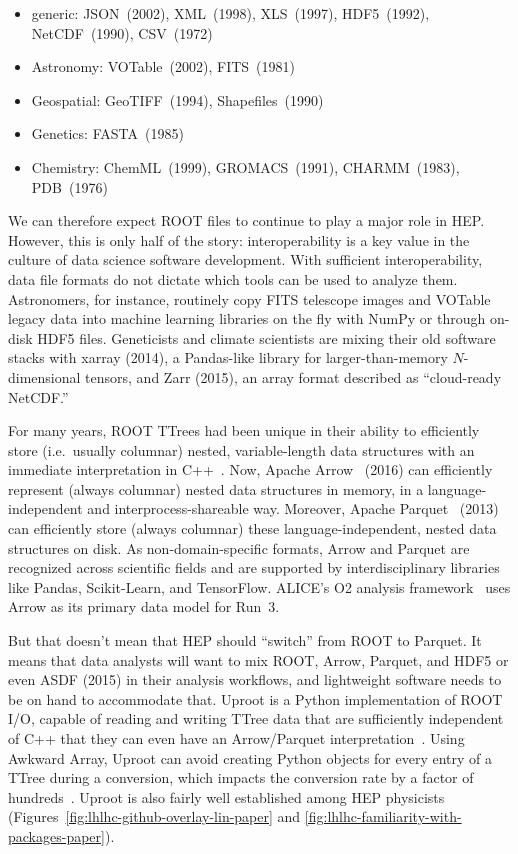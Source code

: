 \documentclass[12pt,a4paper]{article}
\begin{document}
\begin{itemize}\setlength{\itemsep}{-0.15 cm}
\item generic: JSON~(2002), XML~(1998), XLS~(1997), HDF5~(1992), NetCDF~(1990), CSV~(1972)
\item Astronomy: VOTable~(2002), FITS~(1981)
\item Geospatial: GeoTIFF~(1994), Shapefiles~(1990)
\item Genetics: FASTA~(1985)
\item Chemistry: ChemML~(1999), GROMACS~(1991), CHARMM~(1983), PDB~(1976)
\end{itemize}
%
We can therefore expect ROOT files to continue to play a major role in HEP. However, this is only half of the story: interoperability is a key value in the culture of data science software development. With sufficient interoperability, data file formats do not dictate which tools can be used to analyze them. Astronomers, for instance, routinely copy FITS telescope images and VOTable legacy data into machine learning libraries on the fly with NumPy or through on-disk HDF5 files. Geneticists and climate scientists are mixing their old software stacks with xarray (2014), a Pandas-like library for larger-than-memory $N$-dimensional tensors, and Zarr (2015), an array format described as ``cloud-ready NetCDF.''

For many years, ROOT TTrees had been unique in their ability to efficiently store (i.e.\ usually columnar) nested, variable-length data structures with an immediate interpretation in C++~\cite{root-io-survey}. Now, Apache Arrow~\cite{lentner2019shared} (2016) can efficiently represent (always columnar) nested data structures in memory, in a language-independent and interprocess-shareable way. Moreover, Apache Parquet~\cite{vohra2016apache} (2013) can efficiently store (always columnar) these language-independent, nested data structures on disk. As non-domain-specific formats, Arrow and Parquet are recognized across scientific fields and are supported by interdisciplinary libraries like Pandas, Scikit-Learn, and TensorFlow. ALICE's O2 analysis framework~\cite{Alkin:2021mfo} uses Arrow as its primary data model for Run~3.

But that doesn't mean that HEP should ``switch'' from ROOT to Parquet. It means that data analysts will want to mix ROOT, Arrow, Parquet, and HDF5 or even ASDF (2015) in their analysis workflows, and lightweight software needs to be on hand to accommodate that. Uproot is a Python implementation of ROOT I/O, capable of reading and writing TTree data that are sufficiently independent of C++ that they can even have an Arrow/Parquet interpretation~\cite{uproot}. Using Awkward Array, Uproot can avoid creating Python objects for every entry of a TTree during a conversion, which impacts the conversion rate by a factor of hundreds~\cite{Pivarski2017FastAT}. Uproot is also fairly well established among HEP physicists (Figures~\ref{fig:lhlhc-github-overlay-lin-paper} and \ref{fig:lhlhc-familiarity-with-packages-paper}).
\end{document}
